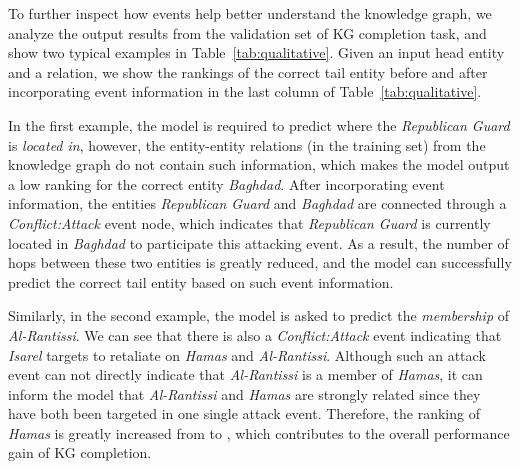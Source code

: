 To further inspect how events help better understand the knowledge graph, we analyze the output results from the validation set of KG completion task, and show two typical examples in Table~\ref{tab:qualitative}.
Given an input head entity and a relation, we show the rankings of the correct tail entity before and after incorporating event information in the last column of Table~\ref{tab:qualitative}.

In the first example, the model is required to predict where the \emph{Republican Guard} is \emph{located in}, however, the entity-entity relations (in the training set) from the knowledge graph do not contain such information, which makes the model output a low ranking for the correct entity \emph{Baghdad}.
After incorporating event information, the entities \emph{Republican Guard} and \emph{Baghdad} are connected through a \emph{Conflict:Attack} event node, which indicates that \emph{Republican Guard} is currently located in \emph{Baghdad} to participate this attacking event.
As a result, the number of hops between these two entities is greatly reduced, and the model can successfully predict the correct tail entity based on such event information.

Similarly, in the second example, the model is asked to predict the \emph{membership} of \emph{Al-Rantissi}.
We can see that there is also a \emph{Conflict:Attack} event indicating that \emph{Isarel} targets to retaliate on \emph{Hamas} and \emph{Al-Rantissi}.
Although such an attack event can not directly indicate that \emph{Al-Rantissi} is a member of \emph{Hamas}, it can inform the model that \emph{Al-Rantissi} and \emph{Hamas} are strongly related since they have both been targeted in one single attack event.
Therefore, the ranking of \emph{Hamas} is greatly increased from  to , which contributes to the overall performance gain of KG completion.







